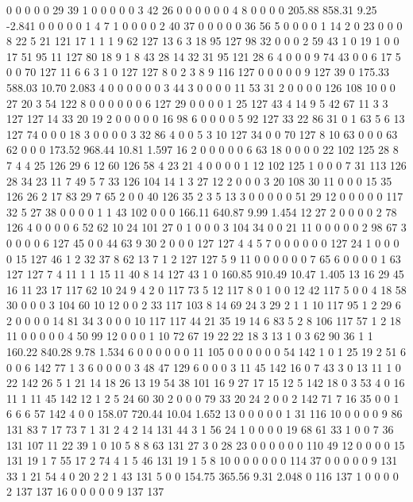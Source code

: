  0 0 0 0 0 29 39 1 0 0 0 0 0 3 42 26 0 0 0 0
 0 0 4 8 0 0 0 0
205.88 858.31 9.25 -2.841
 0 0 0 0 0 1 4 7 1 0 0 0 0 2 40 37 0 0 0 0
 0 36 56 5 0 0 0 0 1 14 2 0 23 0 0 0 8 22 5 21
 121 17 1 1 1 9 62 127 13 6 3 18 95 127 98 32 0 0 0 2
 59 43 1 0 19 1 0 0 17 51 95 11 127 80 18 9 1 8 43 28
 14 32 31 95 121 28 6 4 0 0 0 9 74 43 0 0 6 17 5 0
 0 70 127 11 6 6 3 1 0 127 127 8 0 2 3 8 9 116 127 0
 0 0 0 0 9 127 39 0
175.33 588.03 10.70 2.083
 4 0 0 0 0 0 0 3 44 3 0 0 0 0 11 53 31 2 0 0
 0 0 126 108 10 0 0 27 20 3 54 122 8 0 0 0 0 0 0 6
 127 29 0 0 0 0 1 25 127 43 4 14 9 5 42 67 11 3 3 127
 127 14 33 20 19 2 0 0 0 0 0 16 98 6 0 0 0 0 5 92
 127 33 22 86 31 0 1 63 5 6 13 127 74 0 0 0 18 3 0 0
 0 0 3 32 86 4 0 0 5 3 10 127 34 0 0 70 127 8 10 63
 0 0 0 63 62 0 0 0
173.52 968.44 10.81 1.597
 16 2 0 0 0 0 0 6 63 18 0 0 0 0 22 102 125 28 8 7
 4 4 25 126 29 6 12 60 126 58 4 23 21 4 0 0 0 0 1 12
 102 125 1 0 0 0 7 31 113 126 28 34 23 11 7 49 5 7 33 126
 104 14 1 3 27 12 2 0 0 0 3 20 108 30 11 0 0 0 15 35
 126 26 2 17 83 29 7 65 2 0 0 40 126 35 2 3 5 13 3 0
 0 0 0 0 51 29 12 0 0 0 0 0 117 32 5 27 38 0 0 0
 0 1 1 43 102 0 0 0
166.11 640.87 9.99 1.454
 12 27 2 0 0 0 0 2 78 126 4 0 0 0 0 6 52 62 10 24
 101 27 0 1 0 0 0 3 104 34 0 0 21 11 0 0 0 0 0 2
 98 67 3 0 0 0 0 6 127 45 0 0 44 63 9 30 2 0 0 0
 127 127 4 4 5 7 0 0 0 0 0 0 127 24 1 0 0 0 0 15
 127 46 1 2 32 37 8 62 13 7 1 2 127 127 5 9 11 0 0 0
 0 0 0 7 65 6 0 0 0 0 1 63 127 127 7 4 11 1 1 15
 11 40 8 14 127 43 1 0
160.85 910.49 10.47 1.405
 13 16 29 45 16 11 23 17 117 62 10 24 9 4 2 0 117 73 5 12
 117 8 0 1 0 0 12 42 117 5 0 0 4 18 58 30 0 0 0 3
 104 60 10 12 0 0 2 33 117 103 8 14 69 24 3 29 2 1 1 10
 117 95 1 2 29 6 2 0 0 0 0 14 81 34 3 0 0 0 10 117
 117 44 21 35 19 14 6 83 5 2 8 106 117 57 1 2 18 11 0 0
 0 0 0 4 50 99 12 0 0 0 1 10 72 67 19 22 22 18 3 13
 1 0 3 62 90 36 1 1
160.22 840.28 9.78 1.534
 6 0 0 0 0 0 0 11 105 0 0 0 0 0 0 54 142 1 0 1
 25 19 2 51 6 0 0 6 142 77 1 3 6 0 0 0 0 3 48 47
 129 6 0 0 0 3 11 45 142 16 0 7 43 3 0 13 11 1 0 22
 142 26 5 1 21 14 18 26 13 19 54 38 101 16 9 27 17 15 12 5
 142 18 0 3 53 4 0 16 11 1 11 45 142 12 1 2 5 24 60 30
 2 0 0 0 79 33 20 24 2 0 0 2 142 71 7 16 35 0 0 1
 6 6 6 57 142 4 0 0
158.07 720.44 10.04 1.652
 13 0 0 0 0 0 1 31 116 10 0 0 0 0 9 86 131 83 7 17
 73 7 1 31 2 4 2 14 131 44 3 1 56 24 1 0 0 0 0 19
 68 61 33 1 0 0 7 36 131 107 11 22 39 1 0 10 5 8 8 63
 131 27 3 0 28 23 0 0 0 0 0 0 110 49 12 0 0 0 0 15
 131 19 1 7 55 17 2 74 4 1 5 46 131 19 1 5 8 10 0 0
 0 0 0 0 114 37 0 0 0 0 0 9 131 33 1 21 54 4 0 20
 2 2 1 43 131 5 0 0
154.75 365.56 9.31 2.048
 0 116 137 1 0 0 0 0 2 137 137 16 0 0 0 0 0 9 137 137
